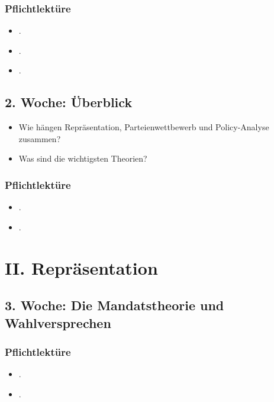 \documentclass[abstract=on,parskip=full,headings=standardclasses,fontsize=11pt,paper=a4]{scrartcl}
\begin{document}
\subsubsection*{Pflichtlektüre}
\begin{itemize}
\item {}.
\item {}.
\item {}.
\end{itemize}



\subsection{2. Woche: Überblick}

\begin{itemize}
\item Wie hängen Repräsentation, Parteienwettbewerb und Policy-Analyse zusammen?
\item Was sind die wichtigsten Theorien?
\end{itemize}


\subsubsection*{Pflichtlektüre}
\begin{itemize}
\item {}.
\item {}.
\end{itemize}


\section{II. Repräsentation}

\subsection{3. Woche: Die Mandatstheorie und Wahlversprechen}

\subsubsection*{Pflichtlektüre}
\begin{itemize}
\item {}.
\item {}.
\end{itemize}
\end{document}
